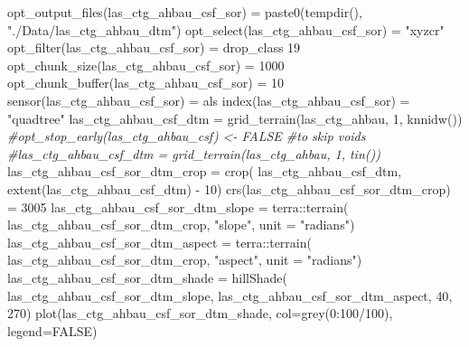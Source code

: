 \documentclass[
]{article}
\newenvironment{Shaded}{\begin{snugshade}}{\end{snugshade}}
\newcommand{\AttributeTok}[1]{\textcolor[rgb]{0.77,0.63,0.00}{#1}}
\newcommand{\CommentTok}[1]{\textcolor[rgb]{0.56,0.35,0.01}{\textit{#1}}}
\newcommand{\ConstantTok}[1]{\textcolor[rgb]{0.00,0.00,0.00}{#1}}
\newcommand{\DecValTok}[1]{\textcolor[rgb]{0.00,0.00,0.81}{#1}}
\newcommand{\FunctionTok}[1]{\textcolor[rgb]{0.00,0.00,0.00}{#1}}
\newcommand{\NormalTok}[1]{#1}
\newcommand{\OtherTok}[1]{\textcolor[rgb]{0.56,0.35,0.01}{#1}}
\newcommand{\SpecialCharTok}[1]{\textcolor[rgb]{0.00,0.00,0.00}{#1}}
\newcommand{\StringTok}[1]{\textcolor[rgb]{0.31,0.60,0.02}{#1}}
\begin{document}
\begin{Shaded}
\begin{Highlighting}[]
\FunctionTok{opt\_output\_files}\NormalTok{(las\_ctg\_ahbau\_csf\_sor) }\OtherTok{=} \FunctionTok{paste0}\NormalTok{(}\FunctionTok{tempdir}\NormalTok{(), }\StringTok{"./Data/las\_ctg\_ahbau\_dtm"}\NormalTok{)}
\FunctionTok{opt\_select}\NormalTok{(las\_ctg\_ahbau\_csf\_sor) }\OtherTok{=} \StringTok{"xyzcr"}
\FunctionTok{opt\_filter}\NormalTok{(las\_ctg\_ahbau\_csf\_sor) }\OtherTok{=} \StringTok{\textquotesingle{}{-}drop\_class 19\textquotesingle{}} 
\FunctionTok{opt\_chunk\_size}\NormalTok{(las\_ctg\_ahbau\_csf\_sor) }\OtherTok{=} \DecValTok{1000} 
\FunctionTok{opt\_chunk\_buffer}\NormalTok{(las\_ctg\_ahbau\_csf\_sor) }\OtherTok{=} \DecValTok{10}
\FunctionTok{sensor}\NormalTok{(las\_ctg\_ahbau\_csf\_sor) }\OtherTok{=} \StringTok{\textquotesingle{}als\textquotesingle{}}
\FunctionTok{index}\NormalTok{(las\_ctg\_ahbau\_csf\_sor) }\OtherTok{=} \StringTok{"quadtree"}
\NormalTok{las\_ctg\_ahbau\_csf\_dtm }\OtherTok{=} \FunctionTok{grid\_terrain}\NormalTok{(las\_ctg\_ahbau, }\DecValTok{1}\NormalTok{, }\FunctionTok{knnidw}\NormalTok{())}
\CommentTok{\#opt\_stop\_early(las\_ctg\_ahbau\_csf) \textless{}{-} FALSE \#to skip voids}
\CommentTok{\#las\_ctg\_ahbau\_csf\_dtm = grid\_terrain(las\_ctg\_ahbau, 1, tin())}
\NormalTok{las\_ctg\_ahbau\_csf\_sor\_dtm\_crop }\OtherTok{=} \FunctionTok{crop}\NormalTok{(}
\NormalTok{  las\_ctg\_ahbau\_csf\_dtm, }\FunctionTok{extent}\NormalTok{(las\_ctg\_ahbau\_csf\_dtm) }\SpecialCharTok{{-}} \DecValTok{10}\NormalTok{)}
\FunctionTok{crs}\NormalTok{(las\_ctg\_ahbau\_csf\_sor\_dtm\_crop) }\OtherTok{=} \DecValTok{3005}
\NormalTok{las\_ctg\_ahbau\_csf\_sor\_dtm\_slope }\OtherTok{=}\NormalTok{ terra}\SpecialCharTok{::}\FunctionTok{terrain}\NormalTok{(}
\NormalTok{  las\_ctg\_ahbau\_csf\_sor\_dtm\_crop, }\StringTok{"slope"}\NormalTok{, }\AttributeTok{unit =} \StringTok{"radians"}\NormalTok{)}
\NormalTok{las\_ctg\_ahbau\_csf\_sor\_dtm\_aspect }\OtherTok{=}\NormalTok{ terra}\SpecialCharTok{::}\FunctionTok{terrain}\NormalTok{(}
\NormalTok{  las\_ctg\_ahbau\_csf\_sor\_dtm\_crop, }\StringTok{"aspect"}\NormalTok{, }\AttributeTok{unit =} \StringTok{"radians"}\NormalTok{)}
\NormalTok{las\_ctg\_ahbau\_csf\_sor\_dtm\_shade }\OtherTok{=} \FunctionTok{hillShade}\NormalTok{(}
\NormalTok{  las\_ctg\_ahbau\_csf\_sor\_dtm\_slope, las\_ctg\_ahbau\_csf\_sor\_dtm\_aspect, }\DecValTok{40}\NormalTok{, }\DecValTok{270}\NormalTok{)}
\FunctionTok{plot}\NormalTok{(las\_ctg\_ahbau\_csf\_sor\_dtm\_shade, }\AttributeTok{col=}\FunctionTok{grey}\NormalTok{(}\DecValTok{0}\SpecialCharTok{:}\DecValTok{100}\SpecialCharTok{/}\DecValTok{100}\NormalTok{), }\AttributeTok{legend=}\ConstantTok{FALSE}\NormalTok{)}
\end{Highlighting}
\end{Shaded}
\end{document}
